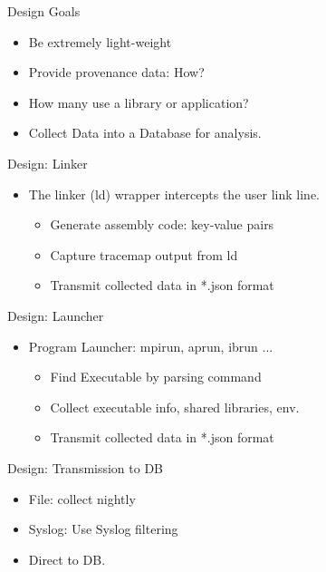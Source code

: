 \documentclass{beamer}
\begin{document}
\begin{frame}{Design Goals}
  \begin{itemize}
    \item Be extremely light-weight
    \item Provide provenance data: How?
    \item How many use a library or application?
    \item Collect Data into a Database for analysis.
  \end{itemize}
\end{frame}

\begin{frame}{Design: Linker }
  \begin{itemize}
    \item The linker (ld) wrapper intercepts the user link line.
      \begin{itemize}
        \item Generate assembly code: key-value pairs
        \item Capture tracemap output from ld
        \item Transmit collected data in *.json format
      \end{itemize}
  \end{itemize}
\end{frame}

\begin{frame}{Design: Launcher}
  \begin{itemize}
    \item Program Launcher: mpirun, aprun, ibrun ...
      \begin{itemize}
        \item Find Executable by parsing command
        \item Collect executable info, shared libraries, env.
        \item Transmit collected data in *.json format
      \end{itemize}
  \end{itemize}
\end{frame}

\begin{frame}{Design: Transmission to DB}
  \begin{itemize}
    \item File: collect nightly
    \item Syslog: Use Syslog filtering
    \item Direct to DB.
  \end{itemize}
\end{frame}
\end{document}
